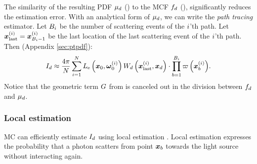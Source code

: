 \documentclass{article}
\begin{document}
The similarity of the resulting \ac{PDF} $\mu_{d}$ (\eqnopar{\ref{eq:final_mu}}) to the \ac{MCF} $f_{d}$ (\eqnopar{\ref{eq:cont_func_scattering}}), significantly reduces the estimation error. With an analytical form of $\mu_{d}$, we can write the {\em path tracing} estimator. Let $B_{i}$ be the number of scattering events of the $i$'th path. Let $\boldsymbol{x}^{\left({i}\right)}_{\text{last}}=\boldsymbol{x}^{\left({i}\right)}_{B_{i}-1}$ be the last location of the last scattering event of the $i$'th path. Then (Appendix \ref{sec:ptpdf}):
\begin{equation}
\label{eq:explicit_foward}
I_{d}\approx \frac{4\pi}{N}\sum_{i=1}^{N}{
L_{\text{e}}\left({\boldsymbol{x}_0,\boldsymbol{\omega}^{\left({i}\right)}_0}\right)W_{d}\left({\boldsymbol{x}^{\left({i}\right)}_{\text{last}},\boldsymbol{x}_{d}}\right) \cdot \prod_{b=1}^{B_{i}}{
\varpi\left({\boldsymbol{x}^{\left({i}\right)}_{b}}\right)}}
.
\end{equation}
Notice that the geometric term $G$ from \eq{\ref{eq:gk},\ref{eq:g0K},\ref{eq:final_mu}} is canceled out in the division between $f_{d}$ and $\mu_{d}$.
\subsubsection{Local estimation}
\ac{MC} can efficiently estimate $I_{d}$ using local estimation \citep{marshak20053d}. Local estimation expresses the probability that a photon scatters from point $\boldsymbol{x}_{b}$ towards the light source without interacting again.
\end{document}
